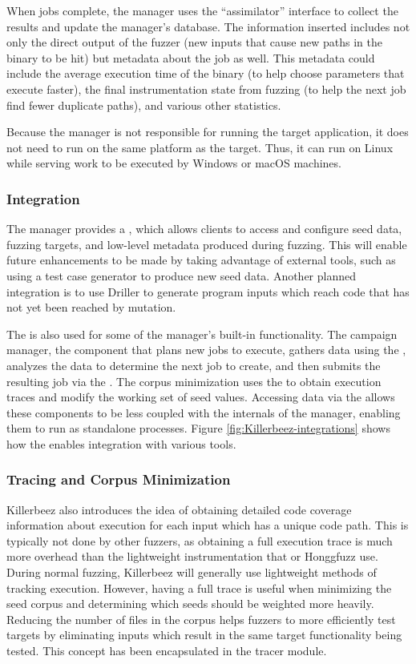 When jobs complete, the manager uses the \BOINC{} ``assimilator'' interface to
collect the results and update the manager's database. The information inserted
includes not only the direct output of the fuzzer (new inputs that cause new
paths in the binary to be hit) but metadata about the job as well. This metadata
could include the average execution time of the binary (to help choose
parameters that execute faster), the final instrumentation state from fuzzing
(to help the next job find fewer duplicate paths), and various other statistics.

Because the manager is not responsible for running the target application, it
does not need to run on the same platform as the target.  Thus, it can run on Linux while
serving work to be executed by Windows or macOS machines.

\subsubsection{Integration}
The manager provides a \REST{} \API{}, which allows clients
to access and configure seed data, fuzzing targets, and low-level metadata
produced during fuzzing.
This will enable future enhancements to be made by taking advantage of
external tools, such as
using a test case generator to produce new seed data. Another planned integration
is to use Driller\cite{driller} to generate program inputs which reach
code that has not yet been reached by mutation.

The \REST{} \API{} is also used for some of the manager's built-in
functionality. The campaign manager, the component that plans new jobs to
execute, gathers data using the \REST{} \API{}, analyzes the data to determine the
next job to create, and then submits the resulting job via the \REST{} \API{}.
The corpus minimization uses the \REST{} \API{} to obtain execution traces and
modify the working set of seed values. Accessing data via the \REST{} \API{}
allows these components to be less coupled with the internals of the manager,
enabling them to run as standalone processes. Figure
\ref{fig:Killerbeez-integrations} shows how the \REST{} \API{} enables
integration with various tools.

\subsubsection{Tracing and Corpus Minimization} \label{Corpus Minimization}
Killerbeez also introduces the idea of obtaining detailed code coverage information about
execution for each input which has a unique code path.  This is typically
not done by other fuzzers, as obtaining a full execution trace is much more overhead than
the lightweight instrumentation that \AFL{} or Honggfuzz\cite{honggfuzz} use.\cite{collafl} During
normal fuzzing, Killerbeez will generally use lightweight methods of tracking
execution. However, having a full trace is useful when minimizing the seed corpus
and determining which seeds should be weighted more heavily. Reducing the
number of files in the corpus helps fuzzers to more efficiently test targets
by eliminating inputs which result in the same target functionality being
tested.\cite{fileformatfuzzing,softwaredumber} This concept has
been encapsulated in the tracer module.

